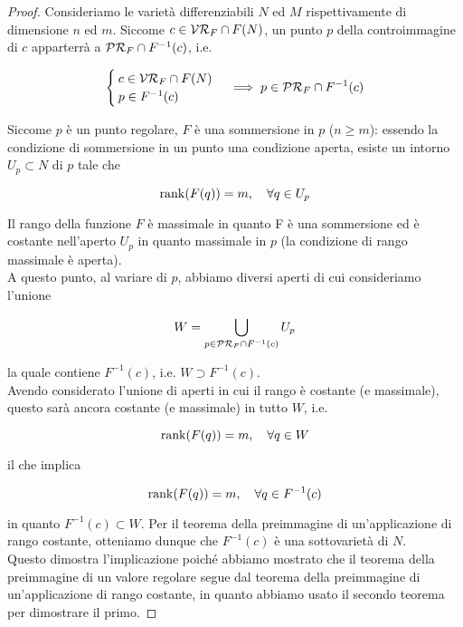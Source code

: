 \begin{proof}
	Consideriamo le varietà differenziabili $ N $ ed $ M $ rispettivamente di dimensione $ n $ ed $ m $. Siccome $ c \in \mathcal{VR}_{F} \cap F(N) $, un punto $ p $ della controimmagine di $ c $ apparterrà a $ \mathcal{PR}_{F} \cap F^{-1}(c) $, i.e.
	
	\begin{equation}
		\begin{cases}
			c \in \VR_{F} \cap F(N) \\
			p \in F^{-1}(c)
		\end{cases} %
		\implies %
		p \in \PR_{F} \cap F^{-1}(c)
	\end{equation}
	
	Siccome $ p $ è un punto regolare, $ F $ è una sommersione in $ p $ ($ n \geqslant m $): essendo la condizione di sommersione in un punto una condizione aperta, esiste un intorno $ U_{p} \subset N $ di $ p $ tale che
	
	\begin{equation}
		\rank(F(q)) = m \qcomma \forall q \in U_{p}
	\end{equation}
	
	Il rango della funzione $ F $ è massimale in quanto F è una sommersione ed è costante nell'aperto $ U_{p} $ in quanto massimale in $ p $ (la condizione di rango massimale è aperta). \\
	A questo punto, al variare di $ p $, abbiamo diversi aperti di cui consideriamo l'unione
	
	\begin{equation}
		W = \bigcup_{p \in \mathcal{PR}_{F} \cap F^{-1}(c)} U_{p}
	\end{equation}
	
	la quale contiene $ F^{-1}(c) $, i.e. $ W \supset F^{-1}(c) $. \\
	Avendo considerato l'unione di aperti in cui il rango è costante (e massimale), questo sarà ancora costante (e massimale) in tutto $ W $, i.e.
	
	\begin{equation}
		\rank(F(q)) = m \qcomma \forall q \in W
	\end{equation}

	il che implica
	
	\begin{equation}
		\rank(F(q)) = m \qcomma \forall q \in F^{-1}(c)
	\end{equation}
	
	in quanto $ F^{-1}(c) \subset W $. Per il teorema della preimmagine di un'applicazione di rango costante, otteniamo dunque che $ F^{-1}(c) $ è una sottovarietà di $ N $. \\	
	Questo dimostra l'implicazione poiché abbiamo mostrato che il teorema della preimmagine di un valore regolare segue dal teorema della preimmagine di un'applicazione di rango costante, in quanto abbiamo usato il secondo teorema per dimostrare il primo.
\end{proof}


